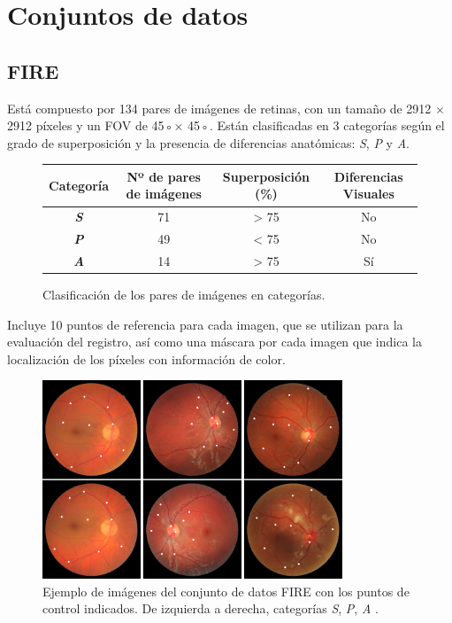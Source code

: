 \section{Conjuntos de datos}
\label{sec:Conjuntos de datos}

\subsection{FIRE}
\label{subsec:FIRE}

Está compuesto por 134 pares de imágenes de retinas, con un tamaño de 2912 × 2912 píxeles y un \gls{FOV} de 45◦× 45◦.
Están clasificadas en 3 categorías según el grado de superposición y la presencia de diferencias anatómicas: \textit{S}, \textit{P} y \textit{A}. \cite{FIRE}

\begin{figure}[tbp]
    \centering
    \setlength{\tabcolsep}{8pt} %
    \begin{tabular}{|c|c|c|c|}
        \hline
        \textbf{Categoría} & \textbf{Nº de pares de imágenes} & \textbf{Superposición (\%)} & \textbf{Diferencias Visuales} \\
        \hline
        \textbf{\textit{\textsf{S}}} & 71 & > 75 & No \\
        \hline
        \textbf{\textit{\textsf{P}}} & 49 & < 75 & No \\
        \hline
        \textbf{\textit{\textsf{A}}} & 14 & > 75 & Sí \\
        \hline
    \end{tabular}
    \caption{Clasificación de los pares de imágenes en categorías.}
    \label{tab:categorias}
\end{figure}
\FloatBarrier

Incluye 10 puntos de referencia para cada imagen, que se utilizan para la evaluación del registro, así como una máscara por cada imagen que indica la localización de los píxeles con información de color.

\begin{figure}[tbp]
    \centering
    \includegraphics[width=0.8\textwidth]{imaxes/fire-ej.png}
    \caption{Ejemplo de imágenes del conjunto de datos FIRE \cite{FIRE} con los puntos de control indicados. De izquierda a derecha, categorías \textit{\textsf{S}}, \textit{\textsf{P}}, \textit{\textsf{A}} .}
    \label{fig:fire_ej}
\end{figure}

